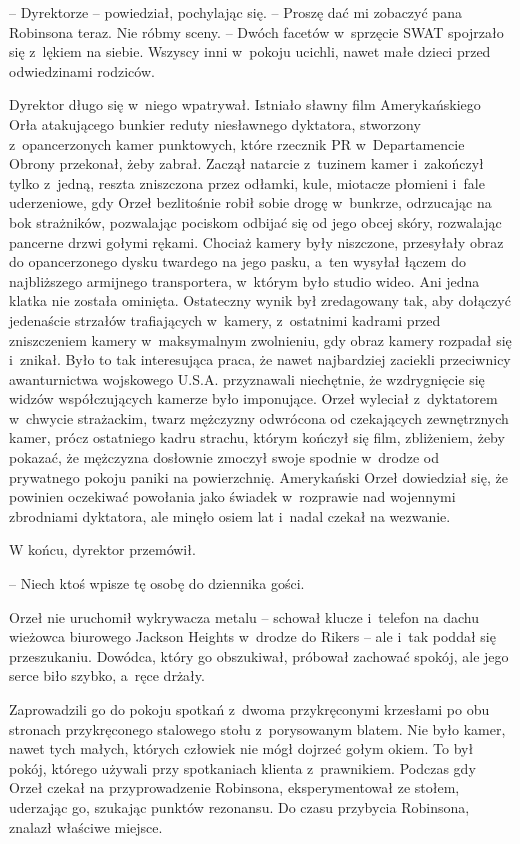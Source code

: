 \documentclass[oneside,polish,11pt,sfheadings]{mwbk}
\begin{document}
-- Dyrektorze -- powiedział, pochylając się. -- Proszę dać mi zobaczyć pana
Robinsona teraz. Nie róbmy sceny. -- Dwóch facetów w~sprzęcie SWAT
spojrzało się z~lękiem na siebie. Wszyscy inni w~pokoju ucichli, nawet
małe dzieci przed odwiedzinami rodziców.

Dyrektor długo się w~niego wpatrywał. Istniało sławny film
Amerykańskiego Orła atakującego bunkier reduty niesławnego dyktatora,
stworzony z~opancerzonych kamer punktowych, które rzecznik PR w~Departamencie Obrony przekonał, żeby zabrał. Zaczął natarcie z~tuzinem
kamer i~zakończył tylko z~jedną, reszta zniszczona przez odłamki, kule,
miotacze płomieni i~fale uderzeniowe, gdy Orzeł bezlitośnie robił sobie
drogę w~bunkrze, odrzucając na bok strażników, pozwalając pociskom
odbijać się od jego obcej skóry, rozwalając pancerne drzwi gołymi
rękami. Chociaż kamery były niszczone, przesyłały obraz do opancerzonego
dysku twardego na jego pasku, a~ten wysyłał łączem do najbliższego
armijnego transportera, w~którym było studio wideo. Ani jedna klatka nie
została ominięta. Ostateczny wynik był zredagowany tak, aby dołączyć
jedenaście strzałów trafiających w~kamery, z~ostatnimi kadrami przed
zniszczeniem kamery w~maksymalnym zwolnieniu, gdy obraz kamery rozpadał
się i~znikał. Było to tak interesująca praca, że nawet najbardziej
zaciekli przeciwnicy awanturnictwa wojskowego U.S.A. przyznawali
niechętnie, że wzdrygnięcie się widzów współczujących kamerze było
imponujące. Orzeł wyleciał z~dyktatorem w~chwycie strażackim, twarz
mężczyzny odwrócona od czekających zewnętrznych kamer, prócz ostatniego
kadru strachu, którym kończył się film, zbliżeniem, żeby pokazać, że
mężczyzna dosłownie zmoczył swoje spodnie w~drodze od prywatnego pokoju
paniki na powierzchnię. Amerykański Orzeł dowiedział się, że powinien
oczekiwać powołania jako świadek w~rozprawie nad wojennymi zbrodniami
dyktatora, ale minęło osiem lat i~nadal czekał na wezwanie.

W końcu, dyrektor przemówił. 

-- Niech ktoś wpisze tę osobę do dziennika
gości.

Orzeł nie uruchomił wykrywacza metalu -- schował klucze i~telefon na
dachu wieżowca biurowego Jackson Heights w~drodze do Rikers -- ale i~tak
poddał się przeszukaniu. Dowódca, który go obszukiwał, próbował zachować
spokój, ale jego serce biło szybko, a~ręce drżały.

Zaprowadzili go do pokoju spotkań z~dwoma przykręconymi krzesłami po obu
stronach przykręconego stalowego stołu z~porysowanym blatem. Nie było
kamer, nawet tych małych, których człowiek nie mógł dojrzeć gołym okiem.
To był pokój, którego używali przy spotkaniach klienta z~prawnikiem.
Podczas gdy Orzeł czekał na przyprowadzenie Robinsona, eksperymentował
ze stołem, uderzając go, szukając punktów rezonansu. Do czasu przybycia
Robinsona, znalazł właściwe miejsce.
\end{document}
